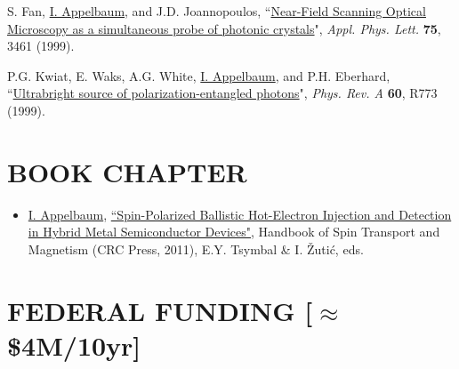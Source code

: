 \documentclass[paper=letter,fontsize=11pt]{scrartcl} %
\newcommand{\NewPart}[2]{\section*{\uppercase{#1} #2}}
\newcommand{\PaperEntry}[7]{
		\noindent #1, ``\href{#7}{#2}", \textit{#3} \textbf{#4}, #5 (#6).}
\newcommand{\ArxivEntry}[3]{
		\noindent #1, ``\href{http://arxiv.org/abs/#3}{#2}", \textit{{cond-mat/}#3}.}
\begin{document}
\begin{etaremune}
\item\PaperEntry{S. Fan, \underline{I. Appelbaum}, and J.D. Joannopoulos}{Near-Field Scanning Optical Microscopy as a simultaneous probe of photonic crystals}%
{Appl. Phys. Lett.}{75}{3461}{1999}{http://dx.doi.org/10.1063/1.125296}

\item\PaperEntry{P.G. Kwiat, E. Waks, A.G. White, \underline{I. Appelbaum}, and P.H. Eberhard}{Ultrabright source of polarization-entangled photons}{Phys. Rev. A}{60}{R773}{1999}{http://dx.doi.org/10.1103/PhysRevA.60.R773}


\end{etaremune}



\NewPart{Book Chapter}{}
\begin{itemize}
\item \underline{I. Appelbaum}, \href{http://www.crcpress.com/product/isbn/9781439803776}{``Spin-Polarized Ballistic Hot-Electron Injection and Detection in Hybrid Metal Semiconductor Devices"}, Handbook of Spin Transport and Magnetism (CRC Press, 2011), E.Y. Tsymbal \& I. \v{Z}uti\'c, eds.
\end{itemize}



\NewPart{Federal Funding}{[$\approx$\$4M/10yr]}
\end{document}

